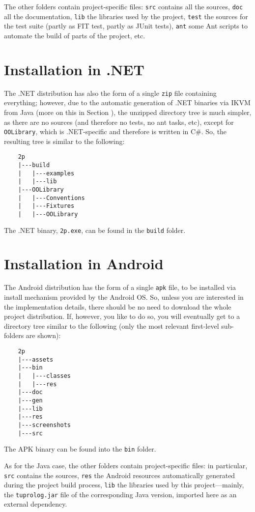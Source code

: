 The other folders contain project-specific files: \texttt{src} contains all the sources, \texttt{doc} all the documentation, \texttt{lib} the libraries used by the \tuprolog{} project, \texttt{test} the sources for the \tuprolog{} test suite (partly as FIT test, partly as JUnit tests), \texttt{ant} some Ant scripts to automate the build of parts of the \tuprolog{} project, etc.


\section{Installation in .NET}

The .NET distribution has also the form of a single \texttt{zip} file containing everything; however, due to the automatic generation of \tuprolog{} .NET binaries via IKVM from Java (more on this in Section ), the unzipped directory tree is much simpler, as there are no sources (and therefore no tests, no ant tasks, etc), except for \texttt{OOLibrary}, which is .NET-specific and therefore is written in C\#.
%
So, the resulting tree is similar to the following:
%
\begin{verbatim}
    2p
    |---build
    |   |---examples
    |   |---lib
    |---OOLibrary
    |   |---Conventions
    |   |---Fixtures
    |   |---OOLibrary
\end{verbatim}
%
The .NET binary, \texttt{2p.exe}, can be found in the \texttt{build} folder.


\section{Installation in Android}

The Android distribution has the form of a single \texttt{apk} file, to be installed via install mechanism provided by the Android OS. 
So, unless you are interested in the implementation details, there should be no need to download the whole project distribution.
If, however, you like to do so, you will eventually get to a directory tree similar to the following (only the most relevant first-level sub-folders are shown):
%
\begin{verbatim}
    2p
    |---assets
    |---bin
    |   |---classes
    |   |---res
    |---doc
    |---gen
    |---lib
    |---res
    |---screenshots
    |---src
\end{verbatim}
%
The APK binary can be found into the \texttt{bin} folder.

As for the Java case, the other folders contain project-specific files: in particular, \texttt{src} contains the sources, \texttt{res} the Android resources automatically generated during the project build process, \texttt{lib} the libraries used by this project---mainly, the \texttt{tuprolog.jar} file of the corresponding Java version, imported here as an external dependency.


